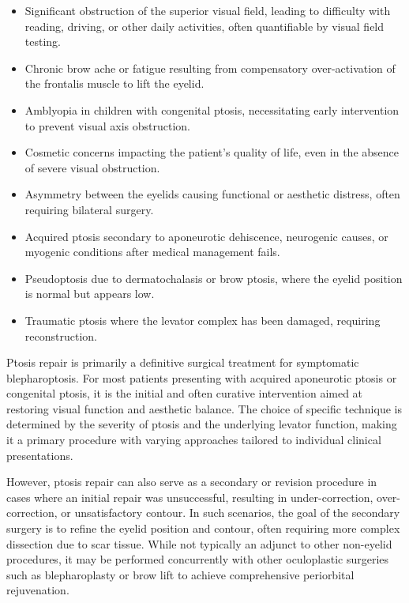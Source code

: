 \begin{itemize}
  \item Significant obstruction of the superior visual field, leading to difficulty with reading, driving, or other daily activities, often quantifiable by visual field testing.
  \item Chronic brow ache or fatigue resulting from compensatory over-activation of the frontalis muscle to lift the eyelid.
  \item Amblyopia in children with congenital ptosis, necessitating early intervention to prevent visual axis obstruction.
  \item Cosmetic concerns impacting the patient's quality of life, even in the absence of severe visual obstruction.
  \item Asymmetry between the eyelids causing functional or aesthetic distress, often requiring bilateral surgery.
  \item Acquired ptosis secondary to aponeurotic dehiscence, neurogenic causes, or myogenic conditions after medical management fails.
  \item Pseudoptosis due to dermatochalasis or brow ptosis, where the eyelid position is normal but appears low.
  \item Traumatic ptosis where the levator complex has been damaged, requiring reconstruction.
\end{itemize}

Ptosis repair is primarily a definitive surgical treatment for symptomatic blepharoptosis. For most patients presenting with acquired aponeurotic ptosis or congenital ptosis, it is the initial and often curative intervention aimed at restoring visual function and aesthetic balance. The choice of specific technique is determined by the severity of ptosis and the underlying levator function, making it a primary procedure with varying approaches tailored to individual clinical presentations.

However, ptosis repair can also serve as a secondary or revision procedure in cases where an initial repair was unsuccessful, resulting in under-correction, over-correction, or unsatisfactory contour. In such scenarios, the goal of the secondary surgery is to refine the eyelid position and contour, often requiring more complex dissection due to scar tissue. While not typically an adjunct to other non-eyelid procedures, it may be performed concurrently with other oculoplastic surgeries such as blepharoplasty or brow lift to achieve comprehensive periorbital rejuvenation.

